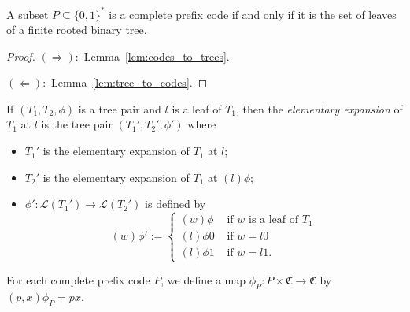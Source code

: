 \begin{theorem}\label{thm:tree=complete_prefix_code}
    A subset \(P\subseteq \{0,1\}^*\) is a complete prefix code if and only if it is the set of leaves of a finite rooted binary tree.
\end{theorem}
\begin{proof}
    \((\Rightarrow):\) Lemma~\ref{lem:codes_to_trees}.

    \((\Leftarrow):\) Lemma~\ref{lem:tree_to_codes}.
\end{proof} 


\begin{definition}\label{def:tree_pair_elementary_expansions}
If \((T_1,T_2,\phi)\) is a tree pair and \(l\) is a leaf of \(T_1\), then the \emph{elementary expansion} of \(T_1\) at \(l\) is the tree pair \((T_1',T_2',\phi')\) where 
\begin{itemize}
    \item \(T_1'\) is the elementary expansion of \(T_1\) at \(l\);
    \item \(T_2'\) is the elementary expansion of \(T_1\) at \((l)\phi\);
    \item \(\phi':\mathcal{L}(T_1')\to \mathcal{L}(T_2')\) is defined by
    \[(w)\phi':=\begin{cases}
        (w)\phi & \text{ if }w\text{ is a leaf of }T_1\\
        (l)\phi 0 & \text{ if }w=l0\\
        (l)\phi 1 & \text{ if }w=l1.
    \end{cases}\]
\end{itemize}
\end{definition}


\begin{definition}\label{def:prefix_cantor_to_cantor}
For each complete prefix code \(P\), we define a map \(\phi_P:P\times \mathfrak{C}\to \mathfrak{C}\) by \((p,x)\phi_P=px\).
\end{definition}

